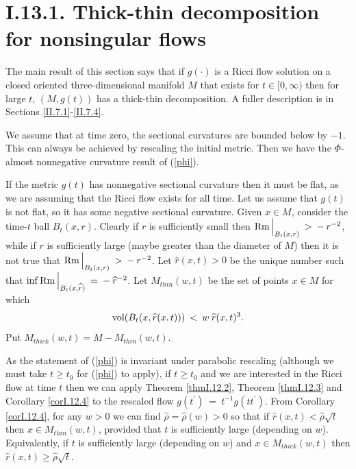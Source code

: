 \section{I.13.1. Thick-thin decomposition for nonsingular flows} \label{I.13.1}

The main result of this section says that if $g(\cdot)$ is a Ricci flow
solution on a closed oriented three-dimensional manifold $M$ that
exists for $t \in [0, \infty)$ then for large $t$, $(M, g(t))$ has a
thick-thin decomposition.
A fuller description is in Sections \ref{II.7.1}-\ref{II.7.4}.

We assume that at time zero, the sectional curvatures are bounded below
by $-1$. This can always be achieved by rescaling the initial
metric.  Then we have the $\Phi$-almost nonnegative curvature result of
(\ref{phi}).

If the metric $g(t)$ has nonnegative sectional curvature then it must be flat, as we are
assuming that the Ricci flow exists for all time. Let us assume that $g(t)$ is not flat, so
it has some negative sectional curvature.
Given $x \in M$, consider the time-$t$ ball $B_t(x,r)$. Clearly if $r$ is
sufficiently small then
$\operatorname{Rm} \Big|_{B_t(x,r)} \: > \: - \: r^{-2}$, while if $r$ is sufficiently large
(maybe greater than the diameter of $M$) then it is not true that
$\operatorname{Rm} \Big|_{B_t(x,r)} \: > \: - \: r^{-2}$.
Let $\widehat{r}(x,t) > 0$ be the unique number such that
$\inf \operatorname{Rm} \Big|_{B_t(x,\widehat{r})} \: = \: - \: \widehat{r}^{-2}$.
Let $M_{thin}(w,t)$ be the set of points $x \in M$ for which
\begin{equation} \label{thinpart}
\operatorname{vol}(B_t(x, \widehat{r}(x,t))) \: < \: w \: \widehat{r}(x,t)^3.
\end{equation}
Put $M_{thick}(w,t) = M - M_{thin}(w,t)$.

As the statement of (\ref{phi}) is invariant under parabolic rescaling
(although we must take $t \ge t_0$ for (\ref{phi}) to apply), if $t \ge t_0$
and we are interested in the Ricci flow at time $t$ then we can apply
Theorem \ref{thmI.12.2}, Theorem \ref{thmI.12.3} and Corollary \ref{corI.12.4}
to the rescaled flow $g(t^\prime) \: = \: t^{-1} g(tt^\prime)$.
From Corollary \ref{corI.12.4},
for any $w > 0$ we can find $\widehat{\rho} = \widehat{\rho}(w) > 0$
so that if $\widehat{r}(x,t) < \widehat{\rho} \sqrt{t}$ then $x \in M_{thin}(w,t)$,
provided that $t$ is
sufficiently large (depending on $w$). Equivalently, if
$t$ is sufficiently large (depending on $w$) and $x \in M_{thick}(w,t)$ then
$\widehat{r}(x,t) \ge \widehat{\rho} \sqrt{t}$.

